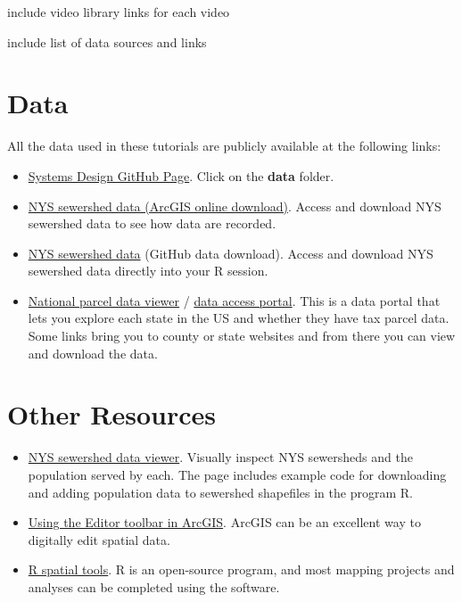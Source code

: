 \documentclass[
]{book}
\begin{document}
include video library links for each video

include list of data sources and links

\hypertarget{data}{%
\section{Data}\label{data}}

All the data used in these tutorials are publicly available at the following links:

\begin{itemize}
\item
  \href{https://github.com/nys-wwsn/Systems-Design-Bookdown}{Systems Design GitHub Page}. Click on the \textbf{data} folder.
\item
  \href{https://www.arcgis.com/home/item.html?id=e795007660ae4a1fae5f86b40d065b3a}{NYS sewershed data (ArcGIS online download)}. Access and download NYS sewershed data to see how data are recorded.
\item
  \href{https://github.com/nys-wwsn/ny-sewer-spatial-data}{NYS sewershed data} (GitHub data download). Access and download NYS sewershed data directly into your R session.
\item
  \href{https://www.arcgis.com/apps/mapviewer/index.html?url=https://services5.arcgis.com/fmKivMCp6fwbWbeE/ArcGIS/rest/services/2023_NSGIC_Parcel_Portal/FeatureServer\&source=sd}{National parcel data viewer} / \href{https://services5.arcgis.com/fmKivMCp6fwbWbeE/ArcGIS/rest/services/2023_NSGIC_Parcel_Portal/FeatureServer}{data access portal}. This is a data portal that lets you explore each state in the US and whether they have tax parcel data. Some links bring you to county or state websites and from there you can view and download the data.
\end{itemize}

\hypertarget{other-resources}{%
\section{Other Resources}\label{other-resources}}

\begin{itemize}
\item
  \href{https://dthill196.github.io/NY-Sewershed-Populations/}{NYS sewershed data viewer}. Visually inspect NYS sewersheds and the population served by each. The page includes example code for downloading and adding population data to sewershed shapefiles in the program R.
\item
  \href{https://desktop.arcgis.com/en/arcmap/latest/manage-data/editing-fundamentals/adding-the-editor-toolbar.htm}{Using the Editor toolbar in ArcGIS}. ArcGIS can be an excellent way to digitally edit spatial data.
\item
  \href{https://r-spatial.org/}{R spatial tools}. R is an open-source program, and most mapping projects and analyses can be completed using the software.
\end{itemize}

  
\end{document}
